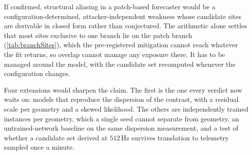 If confirmed, structural aliasing in a patch-based forecaster would be a configuration-determined, attacker-independent weakness whose candidate sites are derivable in closed form rather than conjectured. The arithmetic alone settles that most sites exclusive to one branch lie on the patch branch (\autoref{tab:branchSites}), which the pre-registered mitigation cannot reach whatever the fit returns, so overlap cannot manage any exposure there. It has to be managed around the model, with the candidate set recomputed whenever the configuration changes.

Four extensions would sharpen the claim. The first is the one every verdict now waits on: models that reproduce the dispersion of the contrast, with a residual scale per geometry and a skewed likelihood. The others are independently trained instances per geometry, which a single seed cannot separate from geometry, an untrained-network baseline on the same dispersion measurement, and a test of whether a candidate set derived at $512$\,Hz survives translation to telemetry sampled once a minute.
